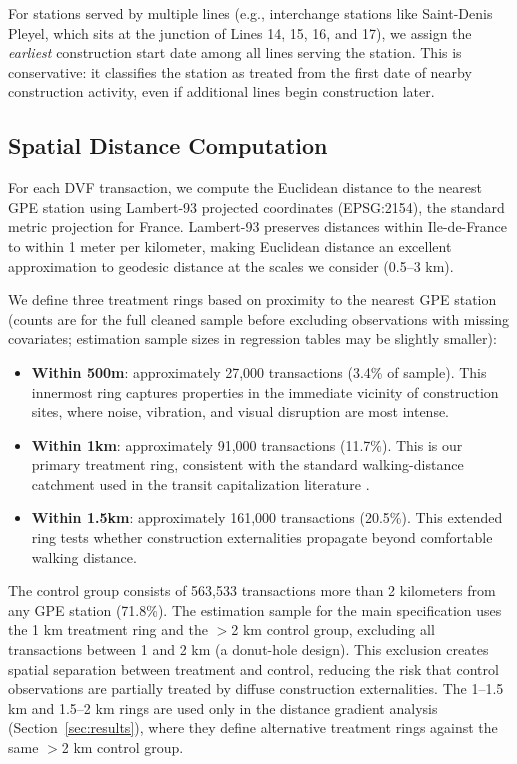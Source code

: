 \documentclass[12pt]{article}
\begin{document}
For stations served by multiple lines (e.g., interchange stations like Saint-Denis Pleyel, which sits at the junction of Lines 14, 15, 16, and 17), we assign the \textit{earliest} construction start date among all lines serving the station. This is conservative: it classifies the station as treated from the first date of nearby construction activity, even if additional lines begin construction later.

\subsection{Spatial Distance Computation}

For each DVF transaction, we compute the Euclidean distance to the nearest GPE station using Lambert-93 projected coordinates (EPSG:2154), the standard metric projection for France. Lambert-93 preserves distances within Ile-de-France to within 1 meter per kilometer, making Euclidean distance an excellent approximation to geodesic distance at the scales we consider (0.5--3 km).

We define three treatment rings based on proximity to the nearest GPE station (counts are for the full cleaned sample before excluding observations with missing covariates; estimation sample sizes in regression tables may be slightly smaller):
\begin{itemize}
\item \textbf{Within 500m}: approximately 27,000 transactions (3.4\% of sample). This innermost ring captures properties in the immediate vicinity of construction sites, where noise, vibration, and visual disruption are most intense.
\item \textbf{Within 1km}: approximately 91,000 transactions (11.7\%). This is our primary treatment ring, consistent with the standard walking-distance catchment used in the transit capitalization literature \citep{gibbons2005valuing, billings2011estimating}.
\item \textbf{Within 1.5km}: approximately 161,000 transactions (20.5\%). This extended ring tests whether construction externalities propagate beyond comfortable walking distance.
\end{itemize}

The control group consists of 563,533 transactions more than 2 kilometers from any GPE station (71.8\%). The estimation sample for the main specification uses the 1 km treatment ring and the $>$2 km control group, excluding all transactions between 1 and 2 km (a donut-hole design). This exclusion creates spatial separation between treatment and control, reducing the risk that control observations are partially treated by diffuse construction externalities. The 1--1.5 km and 1.5--2 km rings are used only in the distance gradient analysis (Section~\ref{sec:results}), where they define alternative treatment rings against the same $>$2 km control group.
\end{document}
